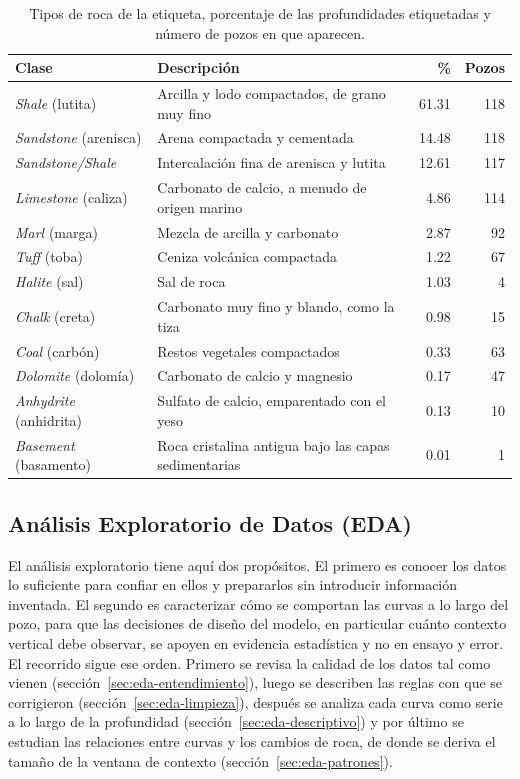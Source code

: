 \documentclass[11pt,a4paper]{article}
\begin{document}
\begin{table}[htbp]
\centering
\small
\caption{Tipos de roca de la etiqueta, porcentaje de las profundidades etiquetadas y número de pozos en que aparecen.}
\label{tab:clases}
\begin{tabular}{lp{6.6cm}rr}
\toprule
\textbf{Clase} & \textbf{Descripción} & \textbf{\%} & \textbf{Pozos} \\
\midrule
\emph{Shale} (lutita) & Arcilla y lodo compactados, de grano muy fino & 61.31 & 118 \\
\emph{Sandstone} (arenisca) & Arena compactada y cementada & 14.48 & 118 \\
\emph{Sandstone/Shale} & Intercalación fina de arenisca y lutita & 12.61 & 117 \\
\emph{Limestone} (caliza) & Carbonato de calcio, a menudo de origen marino & 4.86 & 114 \\
\emph{Marl} (marga) & Mezcla de arcilla y carbonato & 2.87 & 92 \\
\emph{Tuff} (toba) & Ceniza volcánica compactada & 1.22 & 67 \\
\emph{Halite} (sal) & Sal de roca & 1.03 & 4 \\
\emph{Chalk} (creta) & Carbonato muy fino y blando, como la tiza & 0.98 & 15 \\
\emph{Coal} (carbón) & Restos vegetales compactados & 0.33 & 63 \\
\emph{Dolomite} (dolomía) & Carbonato de calcio y magnesio & 0.17 & 47 \\
\emph{Anhydrite} (anhidrita) & Sulfato de calcio, emparentado con el yeso & 0.13 & 10 \\
\emph{Basement} (basamento) & Roca cristalina antigua bajo las capas sedimentarias & 0.01 & 1 \\
\bottomrule
\end{tabular}
\end{table}

\subsection{Análisis Exploratorio de Datos (EDA)}
\label{sec:eda}

El análisis exploratorio tiene aquí dos propósitos. El primero es conocer los datos lo suficiente para confiar en ellos y prepararlos sin introducir información inventada. El segundo es caracterizar cómo se comportan las curvas a lo largo del pozo, para que las decisiones de diseño del modelo, en particular cuánto contexto vertical debe observar, se apoyen en evidencia estadística y no en ensayo y error. El recorrido sigue ese orden. Primero se revisa la calidad de los datos tal como vienen (sección~\ref{sec:eda-entendimiento}), luego se describen las reglas con que se corrigieron (sección~\ref{sec:eda-limpieza}), después se analiza cada curva como serie a lo largo de la profundidad (sección~\ref{sec:eda-descriptivo}) y por último se estudian las relaciones entre curvas y los cambios de roca, de donde se deriva el tamaño de la ventana de contexto (sección~\ref{sec:eda-patrones}).
\end{document}
